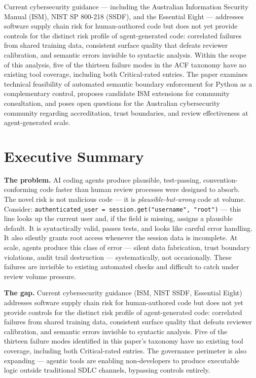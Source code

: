\documentclass[a4paper,11pt]{report}
\begin{document}
Current cybersecurity guidance --- including the Australian Information
Security Manual (ISM), NIST SP 800-218 (SSDF), and the Essential Eight
--- addresses software supply chain risk for human-authored code but
does not yet provide controls for the distinct risk profile of
agent-generated code: correlated failures from shared training data,
consistent surface quality that defeats reviewer calibration, and
semantic errors invisible to syntactic analysis. Within the scope of
this analysis, five of the thirteen failure modes in the ACF taxonomy
have no existing tool coverage, including both Critical-rated entries.
The paper examines technical feasibility of automated semantic boundary
enforcement for Python as a complementary control, proposes candidate
ISM extensions for community consultation, and poses open questions for
the Australian cybersecurity community regarding accreditation, trust
boundaries, and review effectiveness at agent-generated scale.

\hypertarget{executive-summary}{%
\section{Executive Summary}\label{executive-summary}}

\textbf{The problem.} AI coding agents produce plausible, test-passing,
convention-conforming code faster than human review processes were
designed to absorb. The novel risk is not malicious code --- it is
\emph{plausible-but-wrong} code at volume. Consider:
\texttt{authenticated\_user\ =\ session.get("username",\ "root")} ---
this line looks up the current user and, if the field is missing,
assigns a plausible default. It is syntactically valid, passes tests,
and looks like careful error handling. It also silently grants root
access whenever the session data is incomplete. At scale, agents produce
this class of error --- silent data fabrication, trust boundary
violations, audit trail destruction --- systematically, not
occasionally. These failures are invisible to existing automated checks
and difficult to catch under review volume pressure.

\textbf{The gap.} Current cybersecurity guidance (ISM, NIST SSDF,
Essential Eight) addresses software supply chain risk for human-authored
code but does not yet provide controls for the distinct risk profile of
agent-generated code: correlated failures from shared training data,
consistent surface quality that defeats reviewer calibration, and
semantic errors invisible to syntactic analysis. Five of the thirteen
failure modes identified in this paper's taxonomy have no existing tool
coverage, including both Critical-rated entries. The governance
perimeter is also expanding --- agentic tools are enabling
non-developers to produce executable logic outside traditional SDLC
channels, bypassing controls entirely.
\end{document}
